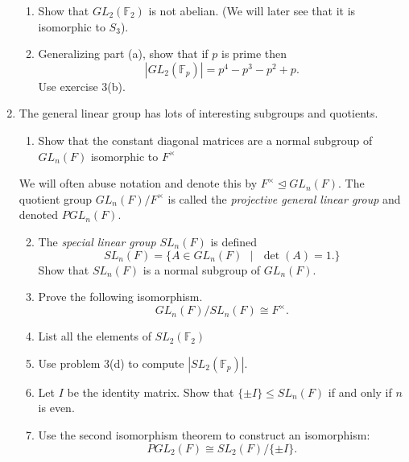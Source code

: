 \documentclass[11pt]{article}
\newcommand{\bF}{\mathbb{F}}
\begin{document}
\begin{enumerate}
\begin{enumerate}
    \item Show that $GL_2(\bF_2)$ is not abelian.  (We will later see that it is isomorphic to $S_3$).
    \item Generalizing part (a), show that if $p$ is prime then
    \[|GL_2(\bF_p)| = p^4-p^3-p^2+p.\]
    Use exercise 3(b).
  \end{enumerate}
  \item The general linear group has lots of interesting subgroups and quotients.
  \begin{enumerate}
    \item Show that the constant diagonal matrices are a normal subgroup of $GL_n(F)$ isomorphic to $F^\times$
  \end{enumerate}
  We will often abuse notation and denote this by $F^\times\unlhd GL_n(F)$.  The quotient group $GL_n(F)/F^\times$ is called the \textit{projective general linear group} and denoted $PGL_n(F)$.
  \begin{enumerate}
    \setcounter{enumii}{1}
    \item The \textit{special linear group} $SL_n(F)$ is defined
    \[SL_n(F) = \{A\in GL_n(F)\text{ }|\text{ }\det(A) = 1.\}\]
    Show that $SL_n(F)$ is a normal subgroup of $GL_n(F)$.
    \item Prove the following isomorphism.
    \[GL_n(F)/SL_n(F)\cong F^\times.\]
    \item List all the elements of $SL_2(\bF_2)$
    \item Use problem 3(d) to compute $|SL_2(\bF_p)|$.
    \item Let $I$ be the identity matrix.  Show that $\{\pm I\}\le SL_n(F)$ if and only if $n$ is even.
    \item Use the second isomorphism theorem to construct an isomorphism:
    \[PGL_2(F)\cong SL_2(F)/\{\pm I\}.\]
  \end{enumerate}
\end{enumerate}
\end{document}
